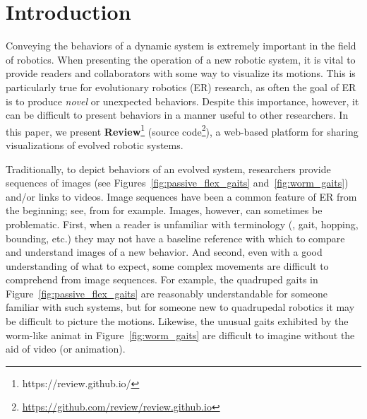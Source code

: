 \section{Introduction}

Conveying the behaviors of a dynamic system is extremely important in the field of robotics.
%
When presenting the operation of a new robotic system, it is vital to provide readers and collaborators with some way to visualize its motions.
%
This is particularly true for evolutionary robotics (ER) research, as
%
often the goal of ER is to produce \emph{novel} or unexpected behaviors.
%
Despite this importance, however, it can be difficult to present behaviors in a manner useful to other researchers.
%
In this paper, we present \textbf{Review}\footnote{https://review.github.io/} (source code\footnote{\url{https://github.com/review/review.github.io}}), a web-based platform for sharing visualizations of evolved robotic systems.




Traditionally, to depict behaviors of an evolved system, researchers provide sequences of images (see Figures~\ref{fig:passive_flex_gaits} and~\ref{fig:worm_gaits}) and/or links to videos.
%
Image sequences have been a common feature of ER from the beginning; see, \textcite{Sims.1994.CGIT.Creatures} from \citeyear{Sims.1994.CGIT.Creatures} for example.
%
Images, however, can sometimes be problematic. First, when a reader is unfamiliar with terminology (\eg{}, gait, hopping, bounding, etc.) they may not have a baseline reference with which to compare and understand images of a new behavior.
%
And second, even with a good understanding of what to expect, some complex movements are difficult to comprehend from image sequences.
%
For example, the quadruped gaits in Figure~\ref{fig:passive_flex_gaits} are reasonably understandable for someone familiar with such systems, but for someone new to quadrupedal robotics it may be difficult to picture the motions.
%
Likewise, the unusual gaits exhibited by the worm-like animat in Figure~\ref{fig:worm_gaits} are difficult to imagine without the aid of video (or animation).



